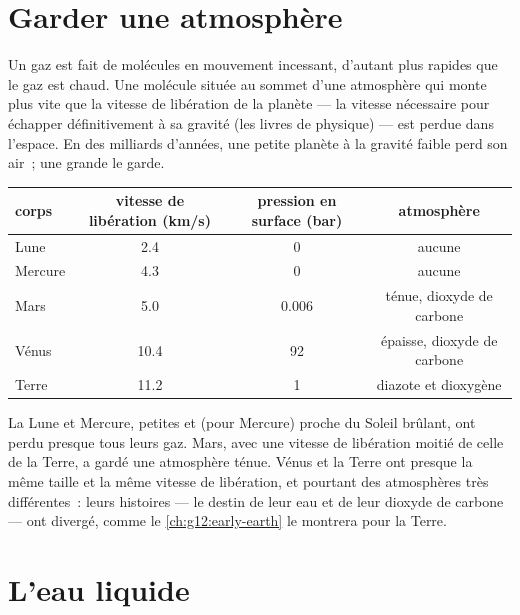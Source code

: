 \section{Garder une atmosphère}

Un gaz est fait de molécules en mouvement incessant, d'autant plus rapides
que le gaz est chaud. Une molécule située au sommet d'une atmosphère qui
monte plus vite que la vitesse de libération de la planète --- la vitesse
nécessaire pour échapper définitivement à sa gravité (les livres de
physique) --- est perdue dans l'espace. En des milliards d'années, une
petite planète à la gravité faible perd son air~; une grande le garde.

\begin{center}
\small
\begin{tabular}{lccc}
\hline
corps & vitesse de libération (\unit{km/s}) & pression en surface (bar) & atmosphère \\
\hline
Lune & 2.4 & 0 & aucune \\
Mercure & 4.3 & 0 & aucune \\
Mars & 5.0 & 0.006 & ténue, dioxyde de carbone \\
Vénus & 10.4 & 92 & épaisse, dioxyde de carbone \\
Terre & 11.2 & 1 & diazote et dioxygène \\
\hline
\end{tabular}
\end{center}

\begin{remark}\label{rem:g10:habitable-planet:size}
La Lune et Mercure, petites et (pour Mercure) proche du Soleil brûlant, ont
perdu presque tous leurs gaz. Mars, avec une vitesse de libération moitié
de celle de la Terre, a gardé une atmosphère ténue. Vénus et la Terre ont
presque la même taille et la même vitesse de libération, et pourtant des
atmosphères très différentes~: leurs histoires --- le destin de leur eau et
de leur dioxyde de carbone --- ont divergé, comme le \cref{ch:g12:early-earth}
le montrera pour la Terre.
\end{remark}

\section{L'eau liquide}

